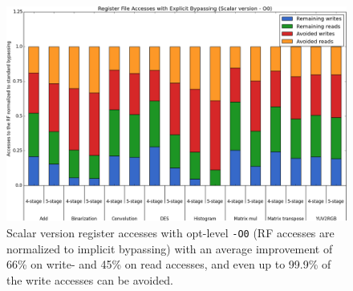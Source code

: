 
\begin{figure}[b!]
\centering
\hspace*{-.12in}
\includegraphics[width=.875\textwidth]{figures/stats/scalar_accesses_O0}
\caption{Scalar version register accesses with opt-level \texttt{-O0} (RF accesses are normalized to implicit bypassing) with an average improvement of 66\% on write- and 45\% on read accesses, and even up to 99.9\% of the write accesses can be avoided.}
\label{fig:scalar_improvements_O0}
\end{figure}




